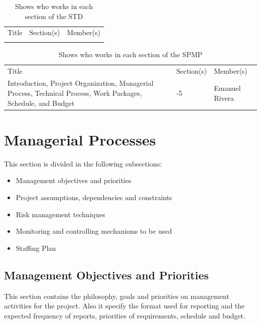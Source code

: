 \documentclass[12pt]{article}
\begin{document}
\begin{table}[H]\centering
\begin{tabular}{|>{\centering\arraybackslash}m{5cm}|>{\centering\arraybackslash}m{5cm}|>{\centering\arraybackslash}m{5cm}|}
  \hline
  \multicolumn{3}{|c|}{STD} \\
  \hline
  Title & Section(s) & Member(s) \\
   \hline
    &  &  \\
   \hline
\end{tabular}
\caption{Shows who works in each section of the STD}
\label{RespSTD}
\end{table}

\begin{table}[H]\centering
\begin{tabular}{|>{\centering\arraybackslash}m{5cm}|>{\centering\arraybackslash}m{5cm}|>{\centering\arraybackslash}m{5cm}|}
  \hline
  \multicolumn{3}{|c|}{SPMP} \\
  \hline
  Title & Section(s) & Member(s) \\
   \hline
   Introduction, Project Organization, Managerial Process, Technical Process, Work Packages, Schedule, and Budget & 1-5  & Emanuel Rivera \\
   \hline
\end{tabular}
\caption{Shows who works in each section of the SPMP}
\label{RespSPMP}
\end{table}

\section{Managerial Processes}
This section is divided in the following subsections:
\begin{itemize}
  \item Management objectives and priorities
  \item Project assumptions, dependencies and constraints
  \item Risk management techniques
  \item Monitoring and controlling mechanisms to be used
  \item Staffing Plan
\end{itemize}

\subsection{Management Objectives and Priorities}
This section contains the philosophy, goals and priorities on management activities for the project. Also it specify the format used for reporting and the expected frequency of reports, priorities of requirements, schedule and budget.
\end{document}
